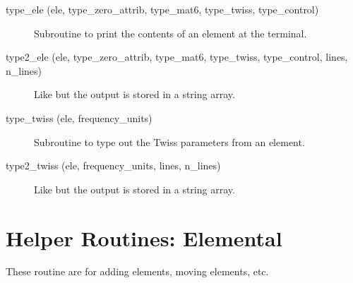 \begin{description}
\item[type\_ele (ele, type\_zero\_attrib, type\_mat6, type\_twiss, 
type\_control)] \Newline
Subroutine to print the contents of an element at the terminal. 

\item[type2\_ele (ele, type\_zero\_attrib, type\_mat6, type\_twiss, 
type\_control, lines, n\_lines)] \Newline
Like  but the output is stored in a string array. 

\item[type\_twiss (ele, frequency\_units)] \Newline
Subroutine to type out the Twiss parameters from an element. 

\item[type2\_twiss (ele, frequency\_units, lines, n\_lines)] \Newline
Like  but the output is stored in a string array. 

\end{description}

\section{Helper Routines: Elemental}
\label{r:elem}     

These routine are for adding elements, moving elements, etc.

